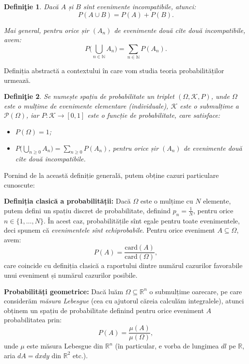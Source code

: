 \documentclass[12pt,a4paper]{article}
\newcommand\kal{\mathcal}
\newcommand\ds{\displaystyle}
\newcommand\seq{\subseteq}
\newcommand\NN{\mathbb{N}}
\newcommand\RR{\mathbb{R}}
\theoremstyle{dotless}
\theoremstyle{dotlessdr}
\newtheorem{definition}{Defini\c{t}ie}
\begin{document}
\begin{definition}\label{def:ev-compat}
  Dacă $ A $ și $ B $ sînt evenimente incompatibile, atunci:
  \[
    P(A \cup B) = P(A) + P(B).
  \]

  Mai general, pentru orice șir $ (A_n) $ de evenimente două cîte două incompatibile,
  avem:
  \[
    P \Big( \bigcup_{n \in \NN} A_n \Big) = \sum_{n \in \NN} P(A_n).
  \]
\end{definition}

Definiția abstractă a contextului în care vom studia teoria probabilităților urmează.

\begin{definition}\label{def:spatiu-prob}
  Se numește \emph{spațiu de probabilitate} un triplet $ (\Omega, \kal{K}, P) $, unde
  $ \Omega $ este o mulțime de evenimente elementare (individuale), $ \kal{K} $ este o
  submulțime a $ \kal{P}(\Omega) $, iar $ P : \kal{K} \to [0, 1] $ este o funcție de
  probabilitate, care satisface:
  \begin{itemize}
  \item $ P(\Omega) = 1 $;
  \item $ P \Big( \ds\bigcup_{n \geq 0} A_n \Big) = \ds\sum_{n \geq 0} P(A_n) $,
    pentru orice șir $ (A_n) $ de evenimente două cîte două incompatibile.
  \end{itemize}
\end{definition}

Pornind de la această definiție generală, putem obține cazuri particulare cunoscute:

\textbf{Definiția clasică a probabilității:} Dacă $ \Omega $ este o mulțime cu $ N $
elemente, putem defini un spațiu discret de probabilitate, definind $ p_n = \frac{1}{N} $,
pentru orice $ n \in \{ 1, \dots, N \}$. În acest caz, probabilitățile sînt egale pentru
toate evenimentele, deci spunem că \emph{evenimentele sînt echiprobabile}. Pentru orice
eveniment $ A \seq \Omega $, avem:
\[
  P(A) = \frac{\mathrm{card}(A)}{\mathrm{card}(\Omega)},
\]
care coincide cu definiția clasică a raportului dintre numărul cazurilor favorabile
unui eveniment și numărul cazurilor posibile.

\vspace{1cm}

\textbf{Probabilități geometrice:} Dacă luăm $ \Omega \seq \RR^n $ o submulțime oarecare,
pe care considerăm \emph{măsura Lebesgue} (cea cu ajutorul căreia calculăm integralele),
atunci obținem un spațiu de probabilitate definind pentru orice eveniment $ A $
probabilitatea prin:
\[
  P(A) = \frac{\mu(A)}{\mu(\Omega)},
\]
unde $ \mu $ este măsura Lebesgue din $ \RR^n $ (în particular, e vorba de lungimea $ dl $
pe $ \RR $, aria $ dA = dxdy $ din $ \RR^2 $ etc.).
\end{document}
